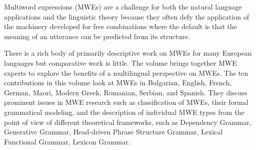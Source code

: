 Multiword expressions (MWEs) are a challenge for both the natural
language applications and the linguistic theory because they often defy
the application of the machinery developed for free combinations where
the default is that the meaning of an utterance can be predicted from
its structure.

There is a rich body of primarily descriptive work on MWEs for many
European languages but comparative work is little. The volume brings
together MWE experts to explore the benefits of a multilingual
perspective on MWEs. The ten contributions in this volume look at MWEs
in Bulgarian, English, French, German, Maori, Modern Greek, Romanian,
Serbian, and Spanish. They discuss prominent issues in MWE research such
as classification of MWEs, their formal grammatical modeling, and the
description of individual MWE types from the point of view of different
theoretical frameworks, such as Dependency Grammar, Generative Grammar,
Head-driven Phrase Structure Grammar, Lexical Functional Grammar,
Lexicon Grammar.
